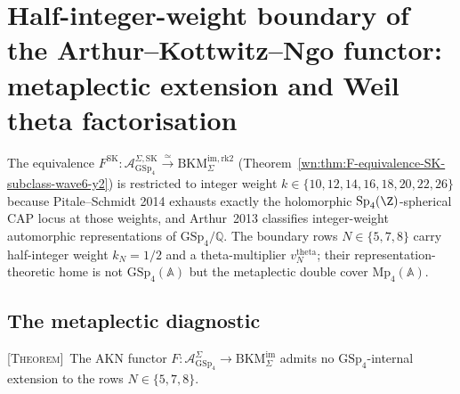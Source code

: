 %

\section{Half-integer-weight boundary of the Arthur--Kottwitz--Ngo
functor: metaplectic extension and Weil theta factorisation}
\label{wn:sec:akn-boundary-half-integer}

\providecommand{\GSp}{\mathrm{GSp}}
\providecommand{\Mp}{\mathrm{Mp}}
\providecommand{\Sp}{\mathrm{Sp}}
\providecommand{\SL}{\mathrm{SL}}
\providecommand{\GSpin}{\mathrm{GSpin}}
\providecommand{\Gamma}{\Gamma}
\providecommand{\BKM}{\mathrm{BKM}}
\providecommand{\kBKM}{\kappa_{\mathrm{BKM}}}
\providecommand{\kch}{\kappa_{\mathrm{ch}}}
\providecommand{\cA}{\mathcal{A}}
\providecommand{\fg}{\mathfrak{g}}
\providecommand{\A}{\mathbb{A}}
\providecommand{\Q}{\mathbb{Q}}
\providecommand{\ClaimStatusTheorem}{\textsc{[Theorem]}}
\providecommand{\ClaimStatusConjectured}{\textsc{[Conjectured]}}
\providecommand{\ClaimStatusAxiomatic}{\textsc{[Axiomatic]}}

The equivalence
$F^{\mathrm{SK}}: \cA^{\Sigma, \mathrm{SK}}_{\GSp_4}
\xrightarrow{\simeq} \BKM^{\mathrm{im}, \mathrm{rk}2}_\Sigma$
(Theorem~\ref{wn:thm:F-equivalence-SK-subclass-wave6-y2}) is
restricted to integer weight $k \in \{10, 12, 14, 16, 18, 20, 22, 26\}$
because Pitale--Schmidt 2014 exhausts exactly the holomorphic
$\Sp_4(\Z)$-spherical CAP locus at those weights, and Arthur~2013
classifies integer-weight automorphic representations of $\GSp_4/\Q$.
The boundary rows $N \in \{5, 7, 8\}$ carry half-integer weight
$k_N = 1/2$ and a theta-multiplier
$v^{\mathrm{theta}}_N$; their representation-theoretic home is not
$\GSp_4(\A)$ but the metaplectic double cover $\Mp_4(\A)$.

\subsection{The metaplectic diagnostic}

\begin{proposition}[Non-extension to $\GSp_4$]
\label{wn:prop:akn-boundary-no-gsp4-extension}
\ClaimStatusTheorem\ The AKN functor
$F: \cA^\Sigma_{\GSp_4} \to \BKM^{\mathrm{im}}_\Sigma$ admits no
$\GSp_4$-internal extension to the rows $N \in \{5, 7, 8\}$.
\end{proposition}


